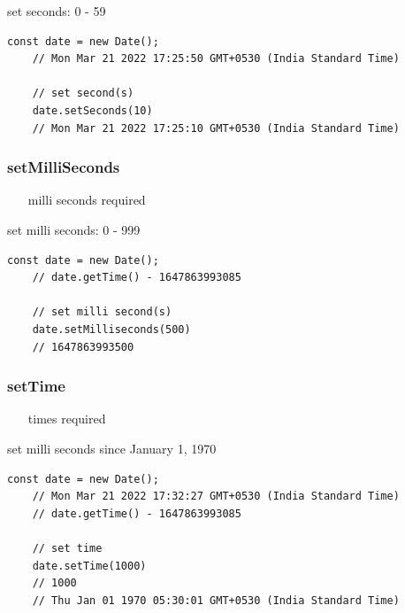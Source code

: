 \documentclass[10pt]{article}
\begin{document}
set seconds: 0 - 59

\begin{lstlisting}[style=ES6, caption={Date methods - second(s)}]
	const date = new Date();
	// Mon Mar 21 2022 17:25:50 GMT+0530 (India Standard Time)
	
	// set second(s)
	date.setSeconds(10)
	// Mon Mar 21 2022 17:25:10 GMT+0530 (India Standard Time)
\end{lstlisting}

\subsubsection{setMilliSeconds}
\begin{itemize}
	\color{red}
	\item[milli seconds] required
\end{itemize}

set milli seconds: 0 - 999

\begin{lstlisting}[style=ES6, caption={Date methods - milli second(s)}]
	const date = new Date();
	// date.getTime() - 1647863993085
	
	// set milli second(s)
	date.setMilliseconds(500)
	// 1647863993500
\end{lstlisting}

\subsubsection{setTime}
\begin{itemize}
	\color{red}
	\item[times] required
\end{itemize}

set milli seconds since January 1,  1970

\begin{lstlisting}[style=ES6, caption={Date methods - time}]
	const date = new Date();
	// Mon Mar 21 2022 17:32:27 GMT+0530 (India Standard Time)
	// date.getTime() - 1647863993085
	
	// set time
	date.setTime(1000)
	// 1000
	// Thu Jan 01 1970 05:30:01 GMT+0530 (India Standard Time)
\end{lstlisting}
\end{document}
